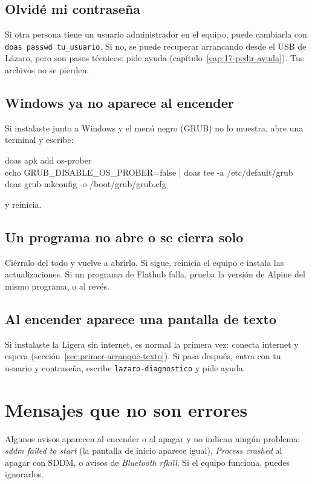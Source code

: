 \subsection{Olvidé mi contraseña}
Si otra persona tiene un usuario administrador en el equipo, puede
cambiarla con \texttt{doas passwd tu\_usuario}. Si no, se puede recuperar
arrancando desde el USB de Lázaro, pero son pasos técnicos: pide ayuda
(capítulo~\ref{cap:17-pedir-ayuda}). Tus archivos no se pierden.

\subsection{Windows ya no aparece al encender}
Si instalaste junto a Windows y el menú negro (GRUB) no lo muestra, abre
una terminal y escribe:
\begin{terminal}
doas apk add os-prober\\
echo GRUB\_DISABLE\_OS\_PROBER=false | doas tee -a /etc/default/grub\\
doas grub-mkconfig -o /boot/grub/grub.cfg
\end{terminal}
y reinicia.

\subsection{Un programa no abre o se cierra solo}
Ciérralo del todo y vuelve a abrirlo. Si sigue, reinicia el equipo e
instala las actualizaciones. Si un programa de Flathub falla, prueba la
versión de Alpine del mismo programa, o al revés.

\subsection{Al encender aparece una pantalla de texto}
Si instalaste la Ligera sin internet, es normal la primera vez: conecta
internet y espera (sección~\ref{sec:primer-arranque-texto}). Si pasa
después, entra con tu usuario y contraseña, escribe
\texttt{lazaro-diagnostico} y pide ayuda.

\section{Mensajes que no son errores}

Algunos avisos aparecen al encender o al apagar y no indican ningún
problema: \emph{sddm failed to start} (la pantalla de inicio aparece
igual), \emph{Process crashed} al apagar con SDDM, o avisos de
\emph{Bluetooth rfkill}. Si el equipo funciona, puedes ignorarlos.

\fuentes
